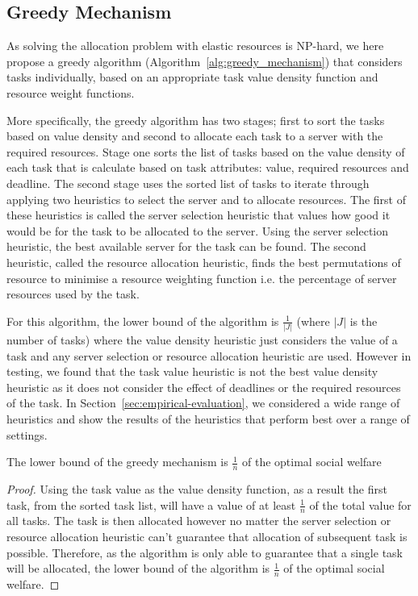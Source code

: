 \subsection{Greedy Mechanism}\label{subsec:greedy-mechanism}
As solving the allocation problem with elastic resources is NP-hard, we here propose a greedy algorithm
(Algorithm~\ref{alg:greedy_mechanism}) that considers tasks individually, based on an appropriate task value density
function and resource weight functions.

More specifically, the greedy algorithm has two stages; first to sort the tasks based on value density and second to
allocate each task to a server with the required resources. Stage one sorts the list of tasks based on the value
density of each task that is calculate based on task attributes: value, required resources and deadline. The second
stage uses the sorted list of tasks to iterate through applying two heuristics to select the server and to allocate
resources. The first of these heuristics is called the server selection heuristic that values how good it would be
for the task to be allocated to the server. Using the server selection heuristic, the best available server for the
task can be found. The second heuristic, called the resource allocation heuristic, finds the best permutations of
resource to minimise a resource weighting function i.e. the percentage of server resources used by the task.

For this algorithm, the lower bound of the algorithm is $\frac{1}{\left|J\right|}$ (where $\left|J\right|$ is the
number of tasks) where the value density heuristic just considers the value of a task and any server selection or
resource allocation heuristic are used. However in testing, we found that the task value heuristic is not the best
value density heuristic as it does not consider the effect of deadlines or the required resources of the task. In
Section~\ref{sec:empirical-evaluation}, we considered a wide range of heuristics and show the results of the heuristics
that perform best over a range of settings.

\begin{theorem}
    The lower bound of the greedy mechanism is $\frac{1}{n}$ of the optimal social welfare
\end{theorem}
\begin{proof}
    Using the task value as the value density function, as a result the first task, from the sorted task list, will
    have a value of at least $\frac{1}{n}$ of the total value for all tasks. The task is then allocated however no
    matter the server selection or resource allocation heuristic can't guarantee that allocation of subsequent task is
    possible. Therefore, as the algorithm is only able to guarantee that a single task will be allocated, the lower
    bound of the algorithm is $\frac{1}{n}$ of the optimal social welfare.
\end{proof} 

